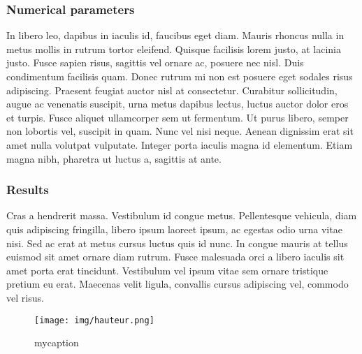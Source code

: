 \subsubsection{Numerical parameters}
%
In libero leo, dapibus in iaculis id, faucibus eget diam. Mauris rhoncus nulla
in metus mollis in rutrum tortor eleifend. Quisque facilisis lorem justo, at
lacinia justo. Fusce sapien risus, sagittis vel ornare ac, posuere nec nisl.
Duis condimentum facilisis quam. Donec rutrum mi non est posuere eget sodales
risus adipiscing. Praesent feugiat auctor nisl at consectetur. Curabitur
sollicitudin, augue ac venenatis suscipit, urna metus dapibus lectus, luctus
auctor dolor eros et turpis. Fusce aliquet ullamcorper sem ut fermentum. Ut
purus libero, semper non lobortis vel, suscipit in quam. Nunc vel nisi neque.
Aenean dignissim erat sit amet nulla volutpat vulputate. Integer porta iaculis
magna id elementum. Etiam magna nibh, pharetra ut luctus a, sagittis at ante.
%
%
\subsubsection{Results}
%
Cras a hendrerit massa. Vestibulum id congue metus. Pellentesque vehicula,
diam quis adipiscing fringilla, libero ipsum laoreet ipsum, ac egestas odio
urna vitae nisi. Sed ac erat at metus cursus luctus quis id nunc. In congue
mauris at tellus euismod sit amet ornare diam rutrum. Fusce malesuada orci a
libero iaculis sit amet porta erat tincidunt. Vestibulum vel ipsum vitae sem
ornare tristique pretium eu erat. Maecenas velit ligula, convallis cursus
adipiscing vel, commodo vel risus.
\begin{figure} [!h]
\centering
\texttt{[image: img/hauteur.png]}
 \caption{mycaption}\label{mylabel}
\end{figure}


